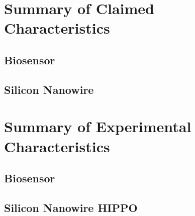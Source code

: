 \documentclass[11pt,journal,compsoc, onecolumn]{IEEEtran}
\begin{document}

%


\appendices
\section{Summary of Claimed Characteristics}
\subsection{Biosensor}
\subsection{Silicon Nanowire}
\section{Summary of Experimental Characteristics}
\subsection{Biosensor}
\subsection{Silicon Nanowire HIPPO}
\end{document}
